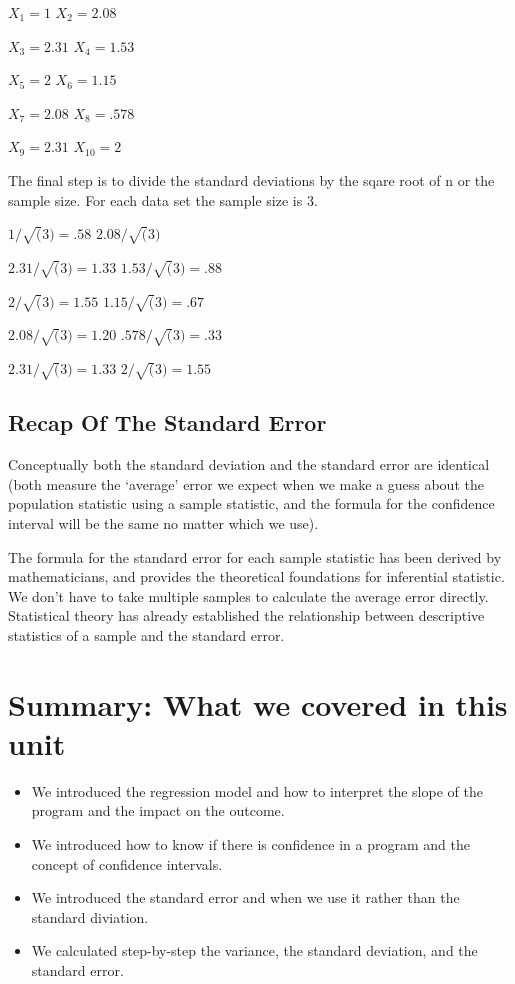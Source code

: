 \documentclass[]{book}
\theoremstyle{definition}
\theoremstyle{definition}
\theoremstyle{definition}
\theoremstyle{remark}
\begin{document}
\(X_{1} = 1\) \(X_{2} = 2.08\)

\(X_{3} = 2.31\) \(X_{4} =1.53\)

\(X_{5} = 2\) \(X_{6} = 1.15\)

\(X_{7} = 2.08\) \(X_{8} = .578\)

\(X_{9} = 2.31\) \(X_{10} = 2\)

The final step is to divide the standard deviations by the sqare root of
n or the sample size. For each data set the sample size is 3.

\(1/\sqrt(3) = .58\) \(2.08/\sqrt(3)\)

\(2.31/\sqrt(3) = 1.33\) \(1.53/\sqrt(3) = .88\)

\(2/\sqrt(3) = 1.55\) \(1.15/\sqrt(3) = .67\)

\(2.08/\sqrt(3) = 1.20\) \(.578/\sqrt(3) = .33\)

\(2.31/\sqrt(3) = 1.33\) \(2/\sqrt(3) = 1.55\)

\hypertarget{recap-of-the-standard-error}{%
\subsection{Recap Of The Standard
Error}\label{recap-of-the-standard-error}}

Conceptually both the standard deviation and the standard error are
identical (both measure the `average' error we expect when we make a
guess about the population statistic using a sample statistic, and the
formula for the confidence interval will be the same no matter which we
use).

The formula for the standard error for each sample statistic has been
derived by mathematicians, and provides the theoretical foundations for
inferential statistic. We don't have to take multiple samples to
calculate the average error directly. Statistical theory has already
established the relationship between descriptive statistics of a sample
and the standard error.

\hypertarget{summary-what-we-covered-in-this-unit}{%
\section{Summary: What we covered in this
unit}\label{summary-what-we-covered-in-this-unit}}

\begin{itemize}
\item
  We introduced the regression model and how to interpret the slope of
  the program and the impact on the outcome.
\item
  We introduced how to know if there is confidence in a program and the
  concept of confidence intervals.
\item
  We introduced the standard error and when we use it rather than the
  standard diviation.
\item
  We calculated step-by-step the variance, the standard deviation, and
  the standard error.
\end{itemize}
\end{document}
